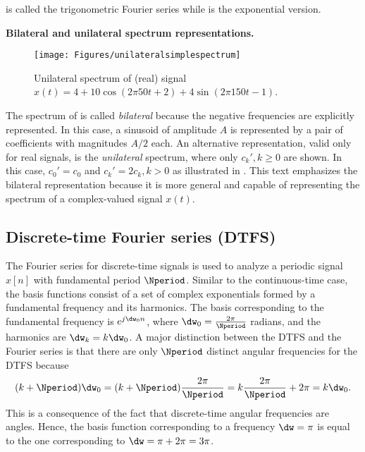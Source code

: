  is called the trigonometric Fourier series while  is the exponential version. %

\bExample \textbf{Bilateral and unilateral spectrum representations.}

\begin{figure}[!htb]
        \centering
                \texttt{[image: Figures/unilateralsimplespectrum]}            
        \caption{Unilateral spectrum of (real) signal $x(t)=4 + 10\cos(2 \pi 50 t + 2) + 4\sin(2 \pi 150 t - 1)$.\label{fig:unilateralsimplespectrum}}
\end{figure}

The spectrum of  is called \emph{bilateral} because the negative frequencies are explicitly represented. In this case, a sinusoid of amplitude $A$ is represented by a pair of coefficients with magnitudes $A/2$ each. An alternative representation, valid only for real signals, is the \emph{unilateral} spectrum, where only $c_k', k \ge 0$ are shown. In this case, $c_0' = c_0$ and $c_k' = 2 c_k, k>0$ as illustrated in . This text emphasizes the bilateral representation because it is more general and capable of representing the spectrum of a complex-valued signal $x(t)$.
\eExample

\subsection{Discrete-time Fourier series (DTFS)}

The Fourier series for discrete-time signals is used to analyze a periodic signal $x[n]$ with fundamental period $\Nperiod$. Similar to the continuous-time case, the basis functions consist of a set of complex exponentials formed by a fundamental frequency and its harmonics. The basis corresponding to the fundamental frequency is $e^{j \dw_0 n}$, where $\dw_0 = \frac{2 \pi}{\Nperiod}$ radians, and the harmonics are $\dw_k = k \dw_0$. A major distinction between the DTFS and the Fourier series is that there are only $\Nperiod$ distinct angular frequencies for the DTFS because
\[
(k+\Nperiod) \dw_0 = (k+\Nperiod) \frac{2 \pi}{\Nperiod} = k \frac{2 \pi}{\Nperiod} + 2 \pi = k \dw_0.
\]
This is a consequence of the fact that discrete-time angular frequencies are angles. Hence, the basis function
corresponding to a frequency $\dw=\pi$ is
equal to the one corresponding to $\dw=\pi + 2\pi = 3\pi$.

